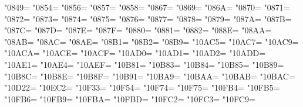 \XeTeXcharclass"0849=\KclassArabR
\XeTeXcharclass"0854=\KclassArabR
\XeTeXcharclass"0856=\KclassArabR
\XeTeXcharclass"0857=\KclassArabR
\XeTeXcharclass"0858=\KclassArabR
\XeTeXcharclass"0867=\KclassArabR
\XeTeXcharclass"0869=\KclassArabR
\XeTeXcharclass"086A=\KclassArabR
\XeTeXcharclass"0870=\KclassArabR
\XeTeXcharclass"0871=\KclassArabR
\XeTeXcharclass"0872=\KclassArabR
\XeTeXcharclass"0873=\KclassArabR
\XeTeXcharclass"0874=\KclassArabR
\XeTeXcharclass"0875=\KclassArabR
\XeTeXcharclass"0876=\KclassArabR
\XeTeXcharclass"0877=\KclassArabR
\XeTeXcharclass"0878=\KclassArabR
\XeTeXcharclass"0879=\KclassArabR
\XeTeXcharclass"087A=\KclassArabR
\XeTeXcharclass"087B=\KclassArabR
\XeTeXcharclass"087C=\KclassArabR
\XeTeXcharclass"087D=\KclassArabR
\XeTeXcharclass"087E=\KclassArabR
\XeTeXcharclass"087F=\KclassArabR
\XeTeXcharclass"0880=\KclassArabR
\XeTeXcharclass"0881=\KclassArabR
\XeTeXcharclass"0882=\KclassArabR
\XeTeXcharclass"088E=\KclassArabR
\XeTeXcharclass"08AA=\KclassArabR
\XeTeXcharclass"08AB=\KclassArabR
\XeTeXcharclass"08AC=\KclassArabR
\XeTeXcharclass"08AE=\KclassArabR
\XeTeXcharclass"08B1=\KclassArabR
\XeTeXcharclass"08B2=\KclassArabR
\XeTeXcharclass"08B9=\KclassArabR
\XeTeXcharclass"10AC5=\KclassArabR
\XeTeXcharclass"10AC7=\KclassArabR
\XeTeXcharclass"10AC9=\KclassArabR
\XeTeXcharclass"10ACA=\KclassArabR
\XeTeXcharclass"10ACE=\KclassArabR
\XeTeXcharclass"10ACF=\KclassArabR
\XeTeXcharclass"10AD0=\KclassArabR
\XeTeXcharclass"10AD1=\KclassArabR
\XeTeXcharclass"10AD2=\KclassArabR
\XeTeXcharclass"10ADD=\KclassArabR
\XeTeXcharclass"10AE1=\KclassArabR
\XeTeXcharclass"10AE4=\KclassArabR
\XeTeXcharclass"10AEF=\KclassArabR
\XeTeXcharclass"10B81=\KclassArabR
\XeTeXcharclass"10B83=\KclassArabR
\XeTeXcharclass"10B84=\KclassArabR
\XeTeXcharclass"10B85=\KclassArabR
\XeTeXcharclass"10B89=\KclassArabR
\XeTeXcharclass"10B8C=\KclassArabR
\XeTeXcharclass"10B8E=\KclassArabR
\XeTeXcharclass"10B8F=\KclassArabR
\XeTeXcharclass"10B91=\KclassArabR
\XeTeXcharclass"10BA9=\KclassArabR
\XeTeXcharclass"10BAA=\KclassArabR
\XeTeXcharclass"10BAB=\KclassArabR
\XeTeXcharclass"10BAC=\KclassArabR
\XeTeXcharclass"10D22=\KclassArabR
\XeTeXcharclass"10EC2=\KclassArabR
\XeTeXcharclass"10F33=\KclassArabR
\XeTeXcharclass"10F54=\KclassArabR
\XeTeXcharclass"10F74=\KclassArabR
\XeTeXcharclass"10F75=\KclassArabR
\XeTeXcharclass"10FB4=\KclassArabR
\XeTeXcharclass"10FB5=\KclassArabR
\XeTeXcharclass"10FB6=\KclassArabR
\XeTeXcharclass"10FB9=\KclassArabR
\XeTeXcharclass"10FBA=\KclassArabR
\XeTeXcharclass"10FBD=\KclassArabR
\XeTeXcharclass"10FC2=\KclassArabR
\XeTeXcharclass"10FC3=\KclassArabR
\XeTeXcharclass"10FC9=\KclassArabR

